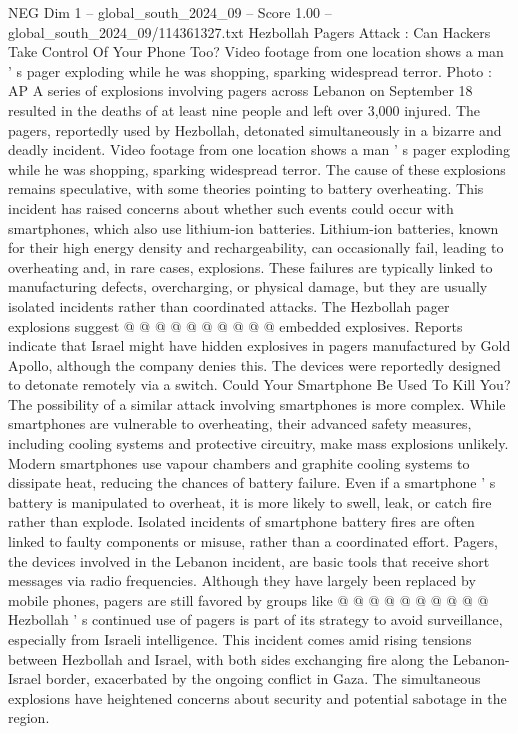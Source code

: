 \begin{textsample}{NEG Dim 1 – global\_south\_2024\_09 – Score 1.00 – global\_south\_2024\_09/114361327.txt}  \label{ex:f1_neg_243}
Hezbollah Pagers Attack : Can Hackers Take Control Of Your Phone Too?
Video footage from one location shows a man ' s pager exploding while he was shopping, sparking widespread terror.
Photo : AP A series of explosions involving pagers across Lebanon on September 18 resulted in the deaths of at least nine people and left over 3,000 injured.
The pagers, reportedly used by Hezbollah, detonated simultaneously in a bizarre and deadly incident.
Video footage from one location shows a man ' s pager exploding while he was shopping, sparking widespread terror.
The cause of these explosions remains speculative, with some theories pointing to battery overheating.
This incident has raised concerns about whether such events could occur with smartphones, which also use lithium-ion batteries.
Lithium-ion batteries, known for their high energy density and rechargeability, can occasionally fail, leading to overheating and, in rare cases, explosions.
These failures are typically linked to manufacturing defects, overcharging, or physical damage, but they are usually isolated incidents rather than coordinated attacks.
The Hezbollah pager explosions suggest @ @ @ @ @ @ @ @ @ @ embedded explosives.
Reports indicate that Israel might have hidden explosives in pagers manufactured by Gold Apollo, although the company denies this.
The devices were reportedly designed to detonate remotely via a switch.
Could Your Smartphone Be Used To Kill You?
The possibility of a similar attack involving smartphones is more complex.
While smartphones are vulnerable to overheating, their advanced safety measures, including cooling systems and protective circuitry, make mass explosions unlikely.
Modern smartphones use vapour chambers and graphite cooling systems to dissipate heat, reducing the chances of battery failure.
Even if a smartphone ' s battery is manipulated to overheat, it is more likely to swell, leak, or catch fire rather than explode.
Isolated incidents of smartphone battery fires are often linked to faulty components or misuse, rather than a coordinated effort.
Pagers, the devices involved in the Lebanon incident, are basic tools that receive short messages via radio frequencies.
Although they have largely been replaced by mobile phones, pagers are still favored by groups like @ @ @ @ @ @ @ @ @ @ Hezbollah ' s continued use of pagers is part of its strategy to avoid surveillance, especially from Israeli intelligence.
This incident comes amid rising tensions between Hezbollah and Israel, with both sides exchanging fire along the Lebanon-Israel border, exacerbated by the ongoing conflict in Gaza.
The simultaneous explosions have heightened concerns about security and potential sabotage in the region.

\end{textsample}
